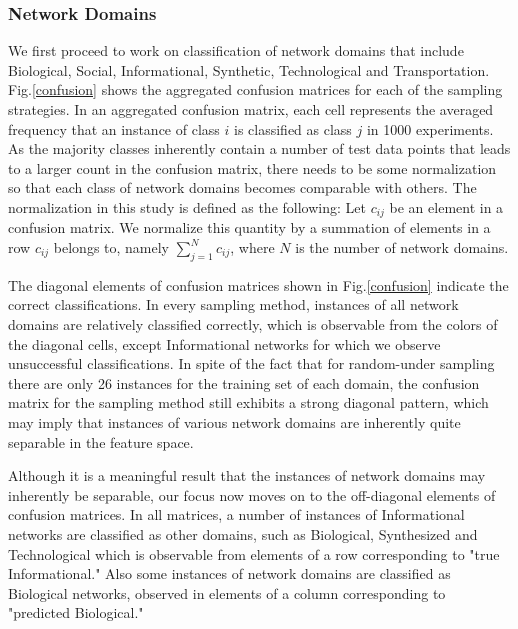 \documentclass{article}
\begin{document}
 
\subsubsection{Network Domains} 
We first proceed to work on classification of network domains that include Biological, Social, Informational, Synthetic, Technological and Transportation. Fig.\ref{confusion} shows the aggregated confusion matrices for each of the sampling strategies. In an aggregated confusion matrix, each cell represents the averaged frequency that an instance of class $i$ is classified as class $j$ in 1000 experiments. As the majority classes inherently contain a number of test data points that leads to a larger count in the confusion matrix, there needs to be some normalization so that each class of network domains becomes comparable with others. The normalization in this study is defined as the following: Let $c_{ij}$ be an element in a confusion matrix. We normalize this quantity by a summation of elements in a row $c_{ij}$ belongs to, namely $\sum_{j=1}^N c_{ij}$, where $N$ is the number of network domains. 

The diagonal elements of confusion matrices shown in Fig.\ref{confusion} indicate the correct classifications. In every sampling method, instances of all network domains are relatively classified correctly, which is observable from the colors of the diagonal cells, except Informational networks for which we observe unsuccessful classifications. In spite of the fact that for random-under sampling there are only 26 instances for the training set of each domain, the confusion matrix for the sampling method still exhibits a strong diagonal pattern, which may imply that instances of various network domains are inherently quite separable in the feature space.

Although it is a meaningful result that the instances of network domains may inherently be separable, our focus now moves on to the off-diagonal elements of confusion matrices. In all matrices, a number of instances of Informational networks are classified as other domains, such as Biological, Synthesized and Technological which is observable from elements of a row corresponding to  "true Informational." Also some instances of network domains are classified as Biological networks, observed in elements of a column corresponding to "predicted Biological." 
\end{document}
